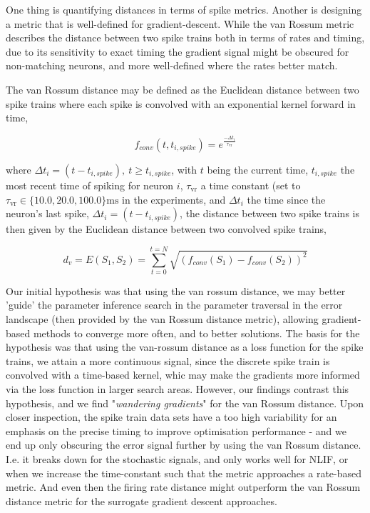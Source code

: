 \documentclass[mphil,deptreport,ianc]{infthesis} %
\begin{document}
One thing is quantifying distances in terms of spike metrics.
Another is designing a metric that is well-defined for gradient-descent.
While the van Rossum metric describes the distance between two spike trains both in terms of rates and timing, due to its sensitivity to exact timing the gradient signal might be obscured for non-matching neurons, and more well-defined where the rates better match.

The van Rossum distance \cite{VanRossum2001} may be defined as the Euclidean distance between two spike trains where each spike is convolved with an exponential kernel forward in time,

\begin{equation}
    f_{conv}(t, t_{i, spike}) = e^{\frac{-\Delta t_i}{\tau_{\mathrm{vr}}}}
\end{equation}

where $\Delta t_i = (t-t_{i, spike}),\ t \geq t_{i,spike}$, 
with $t$ being the current time, $t_{i,spike}$ the most recent time of spiking for neuron $i$, $\tau_{\mathrm{vr}}$ a time constant (set to $\tau_{\mathrm{vr}} \in \{10.0, 20.0, 100.0\} \si{\ms}$ in the experiments, and $\Delta t_i$ the time since the neuron's last spike, $\Delta t_i = (t-t_{i, spike})$, the distance between two spike trains is then given by the Euclidean distance between two convolved spike trains,


\begin{equation}
    d_v = E(S_1, S_2) = \sum_{t=0}^{t=N} \sqrt{(f_{conv}(S_1)-f_{conv}(S_2))^2}
\end{equation}


Our initial hypothesis was that using the van rossum distance, we may better 'guide' the parameter inference search in the parameter traversal in the error landscape (then provided by the van Rossum distance metric), allowing gradient-based methods to converge more often, and to better solutions.
The basis for the hypothesis was that using the van-rossum distance as a loss function for the spike trains, we attain a more continuous signal, since the discrete spike train is convolved with a time-based kernel, whic may make the gradients more informed via the loss function in larger search areas.
However, our findings contrast this hypothesis, and we find "\textit{wandering gradients}" for the van Rossum distance.
Upon closer inspection, the spike train data sets have a too high variability for an emphasis on the precise timing to improve optimisation performance - and we end up only obscuring the error signal further by using the van Rossum distance. 
I.e. it breaks down for the stochastic signals, and only works well for NLIF, or when we increase the time-constant such that the metric approaches a rate-based metric. And even then the firing rate distance might outperform the van Rossum distance metric for the surrogate gradient descent approaches.
\end{document}
